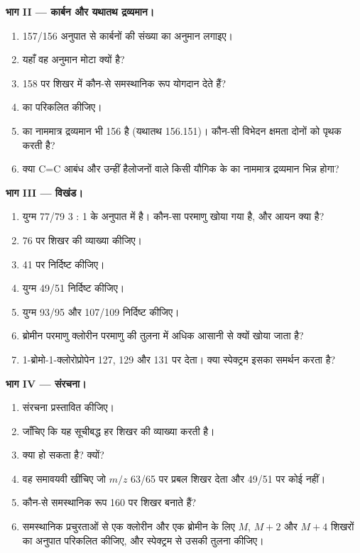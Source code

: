 \begin{problem}
\medskip
\noindent\textbf{भाग II --- कार्बन और यथातथ द्रव्यमान।}
\begin{enumerate}[resume]
  \item 157/156 अनुपात से कार्बनों की संख्या का अनुमान लगाइए।
  \item यहाँ वह अनुमान मोटा क्यों है?
  \item 158 पर शिखर में कौन-से समस्थानिक रूप योगदान देते हैं?
  \item {} का  परिकलित कीजिए।
  \item {} का नाममात्र द्रव्यमान भी 156 है (यथातथ 156.151)। कौन-सी विभेदन क्षमता
        दोनों को पृथक करती है?
  \item क्या C=C आबंध और उन्हीं हैलोजनों वाले किसी यौगिक के  का नाममात्र द्रव्यमान
        भिन्न होगा?
\end{enumerate}

\medskip
\noindent\textbf{भाग III --- विखंड।}
\begin{enumerate}[resume]
  \item युग्म 77/79 3 : 1 के अनुपात में है। कौन-सा परमाणु खोया गया है, और आयन क्या है?
  \item 76 पर शिखर की व्याख्या कीजिए।
  \item 41 पर  निर्दिष्ट कीजिए।
  \item युग्म 49/51 निर्दिष्ट कीजिए।
  \item युग्म 93/95 और 107/109 निर्दिष्ट कीजिए।
  \item ब्रोमीन परमाणु क्लोरीन परमाणु की तुलना में अधिक आसानी से क्यों खोया जाता है?
  \item 1-ब्रोमो-1-क्लोरोप्रोपेन 127, 129 और 131 पर  देता। क्या स्पेक्ट्रम इसका
        समर्थन करता है?
\end{enumerate}

\medskip
\noindent\textbf{भाग IV --- संरचना।}
\begin{enumerate}[resume]
  \item संरचना प्रस्तावित कीजिए।
  \item जाँचिए कि यह सूचीबद्ध हर शिखर की व्याख्या करती है।
  \item क्या  हो सकता है? क्यों?
  \item वह समावयवी खींचिए जो $m/z$ 63/65 पर प्रबल शिखर देता और 49/51 पर कोई नहीं।
  \item कौन-से समस्थानिक रूप 160 पर शिखर बनाते हैं?
  \item समस्थानिक प्रचुरताओं से एक क्लोरीन और एक ब्रोमीन के लिए $M$, $M+2$ और $M+4$ शिखरों का अनुपात
        परिकलित कीजिए, और स्पेक्ट्रम से उसकी तुलना कीजिए।
\end{enumerate}
\end{problem}
